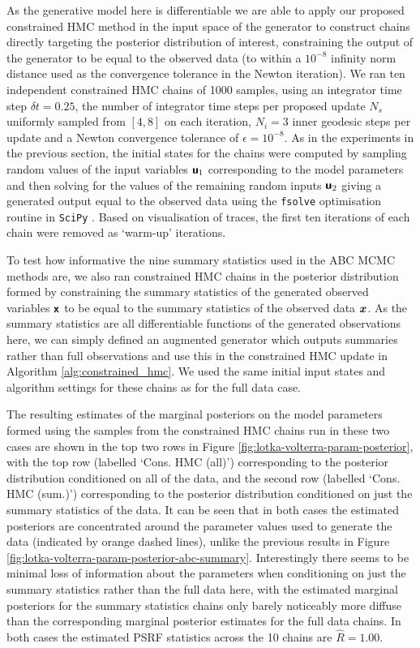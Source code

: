 As the generative model here is differentiable we are able to apply our proposed constrained \ac{HMC} method in the input space of the generator to construct chains directly targeting the posterior distribution of interest, constraining the output of the generator to be equal to the observed data (to within a $10^{-8}$ infinity norm distance used as the convergence tolerance in the Newton iteration). We ran ten independent constrained \ac{HMC} chains of 1000 samples, using an integrator time step $\delta t = 0.25$, the number of integrator time steps per proposed update $N_s$ uniformly sampled from $[4,8]$ on each iteration, $N_i=3$ inner geodesic steps per update and a Newton convergence tolerance of $\epsilon=10^{-8}$. As in the experiments in the previous section, the initial states for the chains were computed by sampling random values of the input variables $\boldsymbol{\mathsf{u}}_1$ corresponding to the model parameters and then solving for the values of the remaining random inputs $\boldsymbol{\mathsf{u}}_2$ giving a generated output equal to the observed data using the \texttt{fsolve} optimisation routine in \texttt{SciPy} \citep{jones2001scipy}. Based on visualisation of traces, the first ten iterations of each chain were removed as `warm-up' iterations.

To test how informative the nine summary statistics used in the \ac{ABC} \ac{MCMC} methods are, we also ran constrained \ac{HMC} chains in the posterior distribution formed by constraining the summary statistics of the generated observed variables $\boldsymbol{\mathsf{x}}$ to be equal to the summary statistics of the observed data $\boldsymbol{x}$. As the summary statistics are all differentiable functions of the generated observations here, we can simply defined an augmented generator which outputs summaries rather than full observations and use this in the constrained \ac{HMC} update in Algorithm \ref{alg:constrained_hmc}. We used the same initial input states and algorithm settings for these chains as for the full data case.

The resulting estimates of the marginal posteriors on the model parameters formed using the samples from the constrained \ac{HMC} chains run in these two cases are shown in the top two rows in Figure \ref{fig:lotka-volterra-param-posterior}, with the top row (labelled `Cons. HMC (all)') corresponding to the posterior distribution conditioned on all of the data, and the second row (labelled `Cons. HMC (sum.)') corresponding to the posterior distribution conditioned on just the summary statistics of the data. It can be seen that in both cases the estimated posteriors are concentrated around the parameter values used to generate the data (indicated by orange dashed lines), unlike the previous results in Figure \ref{fig:lotka-volterra-param-posterior-abc-summary}. Interestingly there seems to be minimal loss of information about the parameters when conditioning on just the summary statistics rather than the full data here, with the estimated marginal posteriors for the summary statistics chains only barely noticeably more diffuse than the corresponding marginal posterior estimates for the full data chains. In both cases the estimated \ac{PSRF} statistics across the 10 chains are $\hat{R} = 1.00$.


